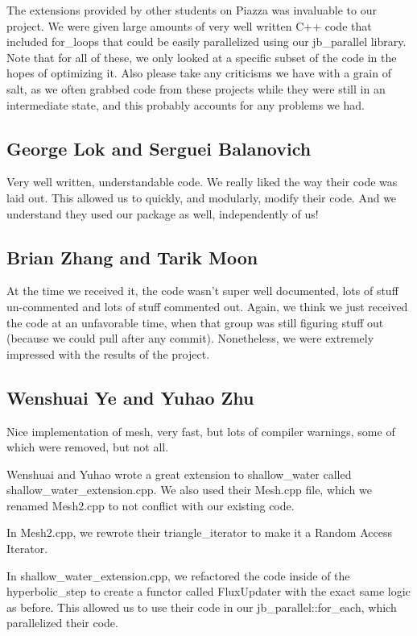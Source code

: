 \documentclass{article}
\begin{document}
The extensions provided by other students on Piazza was invaluable to our project. We were given large amounts of very well written C++ code that included for\_loops that could be easily parallelized using our jb\_parallel library.  Note that for all of these, we only looked at a specific subset of the code in the hopes of optimizing it.  Also please take any criticisms we have with a grain of salt, as we often grabbed code from these projects while they were still in an intermediate state, and this probably accounts for any problems we had.


\subsection{George Lok and Serguei Balanovich}

Very well written, understandable code.  We really liked the way their code was laid out.  This allowed us to quickly, and modularly, modify their code.  And we understand they used our package as well, independently of us!

\subsection{Brian Zhang and Tarik Moon}

At the time we received it, the code wasn't super well documented, lots of stuff un-commented and lots of stuff commented out.  Again, we think we just received the code at an unfavorable time, when that group was still figuring stuff out (because we could pull after any commit).  Nonetheless, we were extremely impressed with the results of the project.

\subsection{Wenshuai Ye and Yuhao Zhu}

Nice implementation of mesh, very fast, but lots of compiler warnings, some of which were removed, but not all.

Wenshuai and Yuhao wrote a great extension to shallow\_water called shallow\_water\_extension.cpp. We also used their Mesh.cpp file, which we renamed Mesh2.cpp to not conflict with our existing code. 

In Mesh2.cpp, we rewrote their triangle\_iterator to make it a Random Access Iterator.

In shallow\_water\_extension.cpp, we refactored the code inside of the hyperbolic\_step to create a functor called FluxUpdater with the exact same logic as before. This allowed us to use their code in our jb\_parallel::for\_each, which parallelized their code.

\end{document}
